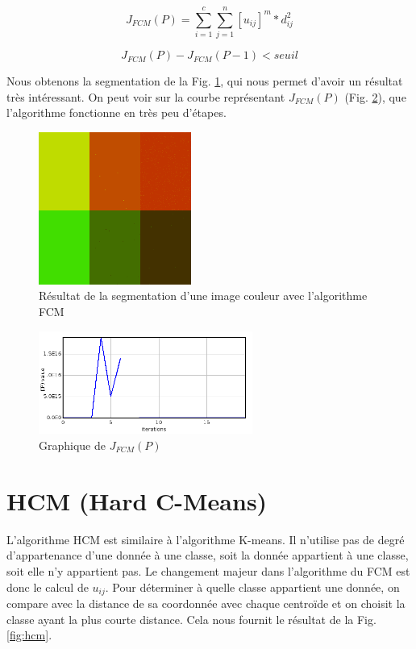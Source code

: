\documentclass[a4paper,11pt]{article}
\begin{document}
\begin{equation}
  \label{jp}
  J_{FCM}(P)=\sum_{i=1}^{c}\sum_{j=1}^{n}[u_{ij}]^m * d_{ij}^2
\end{equation}

\begin{equation}
  \label{jpMin} 
  J_{FCM}(P) - J_{FCM}(P-1) < seuil
\end{equation}

Nous obtenons la segmentation de la Fig. \ref{fig:segmentationFCM}, qui nous permet d'avoir
un résultat très intéressant. On peut voir sur la courbe représentant $J_{FCM}(P)$ (Fig. \ref{fig:graphFCM}), que l'algorithme
fonctionne en très peu d'étapes.

\begin{figure}[!h]
  \begin{center}
    \includegraphics[width=5cm]{resultat/FCM.png}
    \caption{Résultat de la segmentation d'une image couleur avec l'algorithme FCM}
    \label{fig:segmentationFCM}
  \end{center}
\end{figure}

\begin{figure}[!h]
  \begin{center}
    \includegraphics[width=7cm]{resultat/FCM_graph.png}
    \caption{Graphique de $J_{FCM}(P)$}
    \label{fig:graphFCM}
  \end{center}
\end{figure}

\section{HCM (Hard C-Means)}
L'algorithme HCM est similaire à l'algorithme K-means. Il n'utilise pas de degré d'appartenance
d'une donnée à une classe, soit la donnée appartient à une classe, soit elle n'y appartient pas.
Le changement majeur dans l'algorithme du FCM est donc le calcul de $u_{ij}$. Pour déterminer à quelle
classe appartient une donnée, on compare avec la distance de sa coordonnée avec chaque centroïde et
on choisit la classe ayant la plus courte distance. Cela nous fournit le résultat de la Fig. \ref{fig:hcm}.\\
\end{document}
